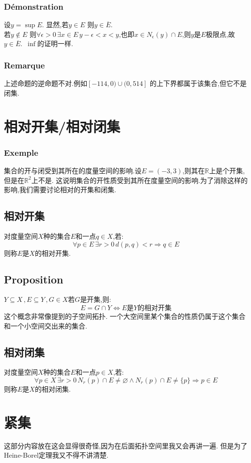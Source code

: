 \documentclass[12pt, a4paper, oneside]{ctexbook}
\newcommand{\R }{\mathbb{R}}%
\begin{document}
  \subsubsection{Démonstration}
  \noindent
  设$y=\sup E$.
  显然,若$y\in E$ 则$y\in \overline{E}$.\\
  若$y\notin E$ 则$\forall\epsilon>0\,\exists x\in E\, y-\epsilon<x<y $,也即$x\in N_\epsilon(y)\cap E$,则$y$是$E$极限点,故$y\in \overline{E}$.\
  $\inf$的证明一样.
  \subsubsection{Remarque}
  上述命题的逆命题不对.例如$[-114,0)\cup(0,514]$ 的上下界都属于该集合,但它不是闭集.
\section{相对开集/相对闭集}
  \subsubsection{Exemple}
  集合的开与闭受到其所在的度量空间的影响.设$E=(-3,3)$,则其在$\R$上是个开集,但是在$\R^2$上不是.
  这说明集合的开性质受到其所在度量空间的影响.为了消除这样的影响,我们需要讨论相对的开集和闭集.
  \subsection{相对开集}
  对度量空间$X$种的集合$E$和一点$q\in X$,若:
  $$
  \forall p\in E\,\exists r>0\,d(p,q)<r \Rightarrow q\in E
  $$
  则称$E$是$X$的相对开集.
  \subsection{Proposition}
  $Y\subseteq X\,,E\subseteq Y\,,G\in X$若$G$是开集,则:
  $$
  E=G\cap Y\Leftrightarrow E\text{是}Y\text{的相对开集}
  $$
  这个概念非常像提到的子空间拓扑.
  一个大空间里某个集合的性质仍属于这个集合和一个小空间交出来的集合.
  \subsection{相对闭集}
  对度量空间$X$种的集合$E$和一点$p\in X$,若:
  $$
  \forall p\in X\, \exists r>0\, N_r(p)\cap E\neq \varnothing\land N_r(p)\cap E\neq\{p\}\Rightarrow p\in E
  $$
  则称$E$是$X$的相对闭集.
  \section{紧集}%
    这部分内容放在这会显得很奇怪,因为在后面拓扑空间里我又会再讲一遍.
    但是为了Heine-Borel定理我又不得不讲清楚.
\end{document}
